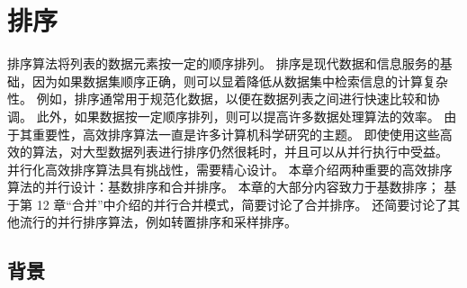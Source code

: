 \section{排序}
排序算法将列表的数据元素按一定的顺序排列。 排序是现代数据和信息服务的基础，因为如果数据集顺序正确，则可以显着降低从数据集中检索信息的计算复杂性。 例如，排序通常用于规范化数据，以便在数据列表之间进行快速比较和协调。 此外，如果数据按一定顺序排列，则可以提高许多数据处理算法的效率。 由于其重要性，高效排序算法一直是许多计算机科学研究的主题。 即使使用这些高效的算法，对大型数据列表进行排序仍然很耗时，并且可以从并行执行中受益。 并行化高效排序算法具有挑战性，需要精心设计。 本章介绍两种重要的高效排序算法的并行设计：基数排序和合并排序。 本章的大部分内容致力于基数排序； 基于第 12 章“合并”中介绍的并行合并模式，简要讨论了合并排序。 还简要讨论了其他流行的并行排序算法，例如转置排序和采样排序。

\subsection{背景}